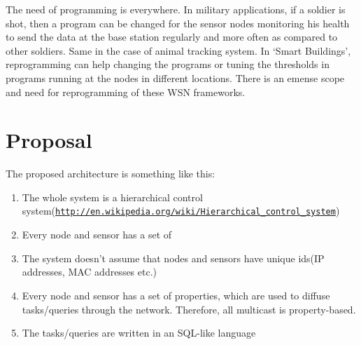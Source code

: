\documentclass[twocolumn]{article}
\begin{document}
The need of programming is everywhere. In military applications, if a soldier is shot, then a program can be changed for the sensor nodes monitoring his health to send the data at the base station regularly and more often as compared to other soldiers. Same in the case of animal tracking system. In `Smart Buildings', reprogramming can help changing the programs or tuning the thresholds in programs running at the nodes in different locations. There is an emense scope and need for reprogramming of these WSN frameworks.

\section{Proposal}
The proposed architecture is something like this:
\begin{enumerate}
\item The whole system is a hierarchical control system(\href{http://en.wikipedia.org/wiki/Hierarchical_control_system}{\nolinkurl{http://en.wikipedia.org/wiki/Hierarchical\_control\_system}})

\item Every node and sensor has a set of 
\item The system doesn’t assume that nodes and sensors have unique ids(IP addresses, MAC addresses etc.)

\item Every node and sensor has a set of properties, which are used to diffuse tasks/queries through the network. Therefore, all multicast is property-based.
\item The tasks/queries are written in an SQL-like language
\end{enumerate}
\end{document}
